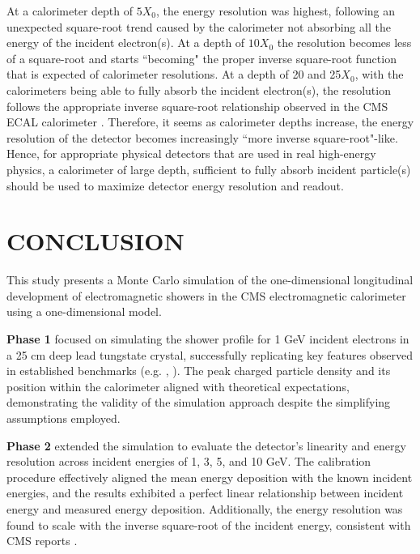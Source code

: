 \documentclass[twocolumn]{aastex631}
\begin{document}
At a calorimeter depth of $5X_0$, the energy resolution was highest, following
an unexpected square-root trend caused by the calorimeter not absorbing all the
energy of the incident electron(s). At a depth of $10X_0$ the resolution becomes less of a
square-root and starts ``becoming" the proper inverse square-root function that
is expected of calorimeter resolutions. At a depth of 20 and 25$X_0$, with the
calorimeters being able to fully absorb the incident electron(s), the resolution
follows the appropriate inverse square-root relationship observed in the CMS
ECAL calorimeter \citep{CMS2024arXiv2403.15518}. Therefore, it seems as
calorimeter depths increase, the energy resolution of the detector becomes
increasingly ``more inverse square-root"-like. Hence, for appropriate physical
detectors that are used in real high-energy physics, a calorimeter of large
depth, sufficient to fully absorb incident particle(s) should be used to maximize
detector energy resolution and readout. 


\section{CONCLUSION} \label{sec_4}
 

This study presents a Monte Carlo simulation of the one-dimensional longitudinal development of
electromagnetic showers in the CMS electromagnetic calorimeter using a one-dimensional model.

\textbf{Phase 1} focused on simulating the shower profile for 1 GeV incident
electrons in a 25 cm deep lead tungstate crystal, successfully replicating key
features observed in established benchmarks (e.g. \cite{CMS2024arXiv2403.15518},
\cite{Groom2019ParticlePassage}). The peak charged particle
density and its position within the calorimeter aligned with theoretical
expectations, demonstrating the validity of the simulation approach despite the
simplifying assumptions employed.

\textbf{Phase 2} extended the simulation to evaluate the detector’s linearity
and energy resolution across incident energies of 1, 3, 5, and 10 GeV. The
calibration procedure effectively aligned the mean energy deposition with the
known incident energies, and the results exhibited a perfect linear relationship
between incident energy and measured energy deposition. Additionally, the energy
resolution was found to scale with the inverse square-root of the incident energy,
consistent with CMS reports \citep{CMS2024arXiv2403.15518}. 
\end{document}
